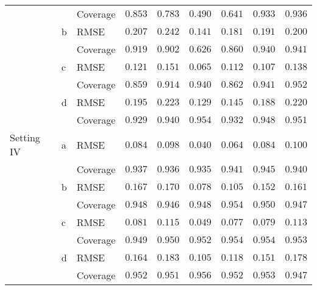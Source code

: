 \begin{tabular}{lllcccccc}
 &  & Coverage  & $0.853$ & $0.783$ & $0.490$ & $0.641$ & $0.933$ & $0.936$ \\
 & \rule{0pt}{1.7\normalbaselineskip}b & RMSE  & $0.207$ & $0.242$ & $0.141$ & $0.181$ & $0.191$ & $0.200$ \\
 &  & Coverage  & $0.919$ & $0.902$ & $0.626$ & $0.860$ & $0.940$ & $0.941$ \\
 & \rule{0pt}{1.7\normalbaselineskip}c & RMSE  & $0.121$ & $0.151$ & $0.065$ & $0.112$ & $0.107$ & $0.138$ \\
 &  & Coverage  & $0.859$ & $0.914$ & $0.940$ & $0.862$ & $0.941$ & $0.952$ \\
 & \rule{0pt}{1.7\normalbaselineskip}d & RMSE  & $0.195$ & $0.223$ & $0.129$ & $0.145$ & $0.188$ & $0.220$ \\
 &  & Coverage  & $0.929$ & $0.940$ & $0.954$ & $0.932$ & $0.948$ & $0.951$ \\
\rule{0pt}{1.7\normalbaselineskip}Setting IV & \nopagebreak a & RMSE  & $0.084$ & $0.098$ & $0.040$ & $0.064$ & $0.084$ & $0.100$ \\
 &  & Coverage  & $0.937$ & $0.936$ & $0.935$ & $0.941$ & $0.945$ & $0.940$ \\
 & \rule{0pt}{1.7\normalbaselineskip}b & RMSE  & $0.167$ & $0.170$ & $0.078$ & $0.105$ & $0.152$ & $0.161$ \\
 &  & Coverage  & $0.948$ & $0.946$ & $0.948$ & $0.954$ & $0.950$ & $0.947$ \\
 & \rule{0pt}{1.7\normalbaselineskip}c & RMSE  & $0.081$ & $0.115$ & $0.049$ & $0.077$ & $0.079$ & $0.113$ \\
 &  & Coverage  & $0.949$ & $0.950$ & $0.952$ & $0.954$ & $0.954$ & $0.953$ \\
 & \rule{0pt}{1.7\normalbaselineskip}d & RMSE  & $0.164$ & $0.183$ & $0.105$ & $0.118$ & $0.151$ & $0.178$ \\
 &  & Coverage  & $0.952$ & $0.951$ & $0.956$ & $0.952$ & $0.953$ & $0.947$ \\
\hline 
\end{tabular}
